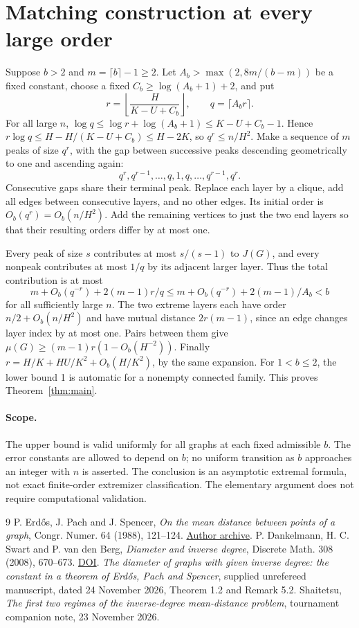 \documentclass[11pt]{article}
\begin{document}
\section{Matching construction at every large order}
Suppose $b>2$ and $m=\lceil b\rceil-1\ge2$.
Let $A_b>\max(2,8m/(b-m))$ be a fixed constant,
choose a fixed $C_b\ge\log(A_b+1)+2$, and put
\[
r=\left\lfloor\frac{H}{K-U+C_b}\right\rfloor,
\qquad q=\lceil A_b r\rceil .
\]
For all large $n$,
$\log q\le \log r+\log(A_b+1)\le K-U+C_b-1$.
Hence $r\log q\le H-H/(K-U+C_b)\le H-2K$,
so $q^r\le n/H^2$.
Make a sequence of $m$ peaks of size $q^r$, with the gap
between successive peaks descending geometrically to one
and ascending again:
\[
 q^r,q^{r-1},\ldots,q,1,q,\ldots,q^{r-1},q^r .
\]
Consecutive gaps share their terminal peak.
Replace each layer by a clique, add all edges between
consecutive layers, and no other edges. Its initial order is
$O_b(q^r)=O_b(n/H^2)$. Add the remaining vertices to just
the two end layers so that their resulting orders differ by
at most one.

Every peak of size $s$ contributes at most $s/(s-1)$ to
$J(G)$, and every nonpeak contributes at most $1/q$ by
its adjacent larger layer. Thus the total contribution is
at most
\[
 m+O_b(q^{-r})+2(m-1)r/q
 \le m+O_b(q^{-r})+2(m-1)/A_b<b
\]
for all sufficiently large $n$. The two extreme layers each
have order $n/2+O_b(n/H^2)$ and have mutual distance
$2r(m-1)$, since an edge changes layer index by at most one.
Pairs between them give
$\mu(G)\ge(m-1)r(1-O_b(H^{-2}))$.
Finally $r=H/K+HU/K^2+O_b(H/K^2)$, by the same expansion.
For $1<b\le2$, the lower bound 1 is automatic for a
nonempty connected family. This proves Theorem~\ref{thm:main}.

\paragraph{Scope.}
The upper bound is valid uniformly for all graphs at each
fixed admissible $b$. The error constants are allowed to depend
on $b$; no uniform transition as $b$ approaches an integer
with $n$ is asserted. The conclusion is an asymptotic
extremal formula, not exact finite-order extremizer
classification. The elementary argument does not require
computational validation.

\begin{thebibliography}{9}
P. Erd\H{o}s, J. Pach and J. Spencer,
\emph{On the mean distance between points of a graph},
Congr. Numer. 64 (1988), 121--124.
\href{https://www.renyi.hu/~p_erdos/1988-23.pdf}{Author archive}.
P. Dankelmann, H. C. Swart and P. van den Berg,
\emph{Diameter and inverse degree},
Discrete Math. 308 (2008), 670--673.
\href{https://doi.org/10.1016/j.disc.2007.07.053}{DOI}.
\emph{The diameter of graphs with given inverse degree:
the constant in a theorem of Erd\H{o}s, Pach and Spencer},
supplied unrefereed manuscript, dated 24 November 2026,
Theorem 1.2 and Remark 5.2.
Shaitetsu, \emph{The first two regimes of the inverse-degree
mean-distance problem}, tournament companion note, 23 November 2026.
\end{thebibliography}
\end{document}
